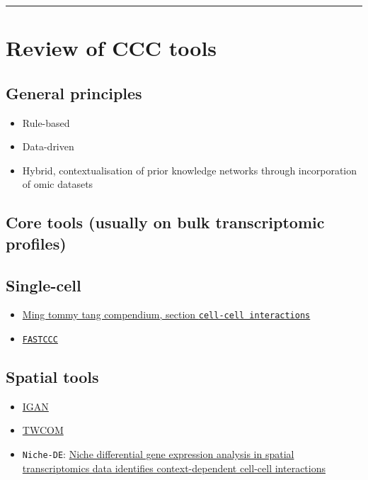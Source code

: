 \documentclass[
  letterpaper,
]{book}
\providecommand{\tightlist}{%
  \setlength{\itemsep}{0pt}\setlength{\parskip}{0pt}}\usepackage{longtable,booktabs,array}
\begin{document}
\begin{center}\rule{0.5\linewidth}{0.5pt}\end{center}

\section{Review of CCC tools}\label{review-of-ccc-tools}

\subsection{General principles}\label{general-principles}

\begin{itemize}
\tightlist
\item
  Rule-based
\item
  Data-driven
\item
  Hybrid, contextualisation of prior knowledge networks through
  incorporation of omic datasets
\end{itemize}

\subsection{Core tools (usually on bulk transcriptomic
profiles)}\label{core-tools-usually-on-bulk-transcriptomic-profiles}

\subsection{Single-cell}\label{single-cell}

\begin{itemize}
\tightlist
\item
  \href{https://github.com/crazyhottommy/scRNAseq-analysis-notes}{Ming
  tommy tang compendium, section \texttt{cell-cell\ interactions}}
\item
  \href{https://www.biorxiv.org/content/10.1101/2025.01.27.635115v1}{\texttt{FASTCCC}}
\end{itemize}

\subsection{Spatial tools}\label{spatial-tools}

\begin{itemize}
\tightlist
\item
  \href{https://github.com/Zhu-JC/IGAN}{IGAN}
\item
  \href{https://doi.org/10.1093/bioadv/vbae101}{TWCOM}
\item
  \texttt{Niche-DE}:
  \href{https://www.biorxiv.org/content/10.1101/2023.01.03.522646v1.full.pdf}{Niche
  differential gene expression analysis in spatial transcriptomics data
  identifies context-dependent cell-cell interactions}
\end{itemize}
\end{document}
